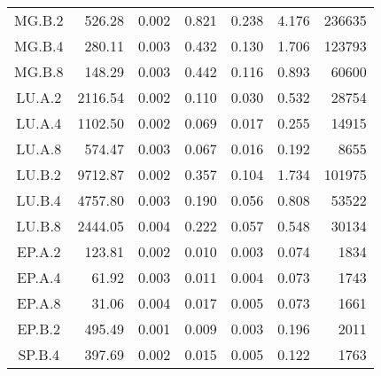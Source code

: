 \begin{ThreePartTable}
\begin{longtable}[c]{c*{6}{r}}
        MG.B.2                 & 526.28                              & 0.002                               & 0.821          & 0.238 & 4.176 & 236635 \\
        MG.B.4                 & 280.11                              & 0.003                               & 0.432          & 0.130 & 1.706 & 123793 \\
        MG.B.8                 & 148.29                              & 0.003                               & 0.442          & 0.116 & 0.893 & 60600  \\
        LU.A.2                 & 2116.54                             & 0.002                               & 0.110          & 0.030 & 0.532 & 28754  \\
        LU.A.4                 & 1102.50                             & 0.002                               & 0.069          & 0.017 & 0.255 & 14915  \\
        LU.A.8                 & 574.47                              & 0.003                               & 0.067          & 0.016 & 0.192 & 8655   \\
        LU.B.2                 & 9712.87                             & 0.002                               & 0.357          & 0.104 & 1.734 & 101975 \\
        LU.B.4                 & 4757.80                             & 0.003                               & 0.190          & 0.056 & 0.808 & 53522  \\
        LU.B.8                 & 2444.05                             & 0.004                               & 0.222          & 0.057 & 0.548 & 30134  \\
        EP.A.2                 & 123.81                              & 0.002                               & 0.010          & 0.003 & 0.074 & 1834   \\
        EP.A.4                 & 61.92                               & 0.003                               & 0.011          & 0.004 & 0.073 & 1743   \\
        EP.A.8                 & 31.06                               & 0.004                               & 0.017          & 0.005 & 0.073 & 1661   \\
        EP.B.2                 & 495.49                              & 0.001                               & 0.009          & 0.003 & 0.196 & 2011   \\
        SP.B.4                 & 397.69                              & 0.002                               & 0.015          & 0.005 & 0.122 & 1763   \\

\end{longtable}
\end{ThreePartTable}
